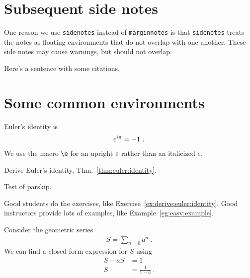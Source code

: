 \section{Subsequent side notes}

One reason we use \texttt{sidenotes} instead of \texttt{marginnotes} is that \texttt{sidenotes} treats the notes as floating environments that do not overlap with one another. These side notes may cause warnings, but should not overlap.

Here's a sentence with some citations.



\section{Some common environments}



\begin{theorem}
\label{thm:euler:identity}
    Euler's identity is
    \begin{align}
        \operatorname{e}^{i\pi} = -1 \ .
    \end{align}
    We use the macro \verb!\e! for an upright $\operatorname{e}$ rather than an italicized $e$.
\end{theorem}

\begin{exercise}
\label{ex:derive:euler:identity}
    Derive Euler's identity, Thm.~\ref{thm:euler:identity}.

    Test of parskip.
\end{exercise}

\noindent Good students do the exercises, like Exercise~\ref{ex:derive:euler:identity}. Good instructors provide lots of examples, like Example~\ref{eg:easy:example}.

\begin{example}
\label{eg:easy:example}
    Consider the geometric series
    \begin{align}
        S = \sum_{n=0} a^n \ .
    \end{align}
    We can find a closed form expression for $S$ using
    \begin{align}
        S - aS &= 1\\
        S &= \frac{1}{1-a} \ .
    \end{align}
\end{example}

